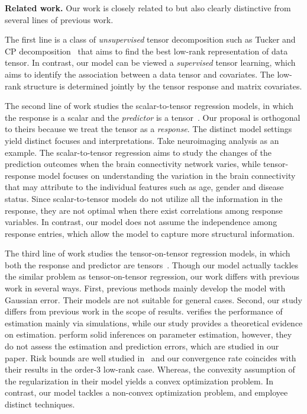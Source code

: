 \documentclass[12pt]{article}
\theoremstyle{plain}
\theoremstyle{definition}
\begin{document}
{\bf Related work.} Our work is closely related to but also clearly distinctive from several lines of previous work.

The first line is a class of \textit{unsupervised} tensor decomposition such as Tucker and CP decomposition~\citep{de2000multilinear, kolda2009tensor,zhang2018tensor, hong2020generalized} that aims to find the best low-rank representation of data tensor. In contrast, our model can be viewed a \textit{supervised} tensor learning, which aims to identify the association between a data tensor and covariates. The low-rank structure is determined jointly by the tensor response and matrix covariates.

The second line of work studies the scalar-to-tensor regression models, in which the response is a scalar and the \textit{predictor} is a tensor~\citep{zhou2013tensor,chen2019non}. Our proposal is orthogonal to theirs because we treat the tensor as a \textit{response}. The distinct model settings yield distinct focuses and interpretations. Take neuroimaging analysis as an example. The scalar-to-tensor regression aims to study the changes of the prediction outcomes when the brain connectivity network varies, while tensor-response model focuses on understanding the variation in the brain connectivity that may attribute to the individual features such as age, gender and disease status. Since scalar-to-tensor models do not utilize all the information in the response, they are not optimal when there exist correlations among response variables. In contrast, our model does not assume the independence among response entries, which allow the model to capture more structural information. 

The third line of work studies the tensor-on-tensor regression models, in which both the response and predictor are tensors~\citep{raskutti2015convex, lock2018tensor, llosa2018tensor, gahrooei2020multiple}. Though our model actually tackles the similar problem as tensor-on-tensor regression, our work differs with previous work in several ways. First, previous methods mainly develop the model with Gaussian error. Their models are not suitable for general cases. Second, our study differs from previous work in the scope of results. \citep{gahrooei2020multiple} verifies the performance of estimation mainly via simulations, while our study provides a theoretical evidence on estimation. \citep{lock2018tensor, llosa2018tensor} perform solid inferences on parameter estimation, however, they do not assess the estimation and prediction errors, which are studied in our paper. Risk bounds are well studied in~\citep{raskutti2015convex} and our convergence rate coincides with their results in the order-3 low-rank case. Whereas, the convexity assumption of the regularization in their model yields a convex optimization problem. In contrast,  our model tackles a non-convex optimization problem, and employee distinct techniques. 
\end{document}
